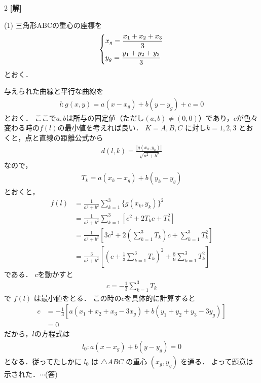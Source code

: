 \documentclass[../../../../main.tex]{subfiles}
\begin{document}
\setcounter{equation}{0}
\begin{oframed}
  
\end{oframed}
\setlength{\columnseprule}{0.4pt}
\begin{multicols}{2}
  {\bf[解]}

  (1)
  三角形ABCの重心の座標を
  \begin{align}
    \begin{dcases}
      x_g = \frac{x_1+x_2+x_3}{3} \\
      y_g = \frac{y_1+y_2+y_3}{3}
    \end{dcases}
  \end{align}
  とおく．

  与えられた曲線と平行な曲線を
  \begin{align*}
    l: g(x,y) = a(x-x_g) + b(y-y_g) + c = 0
  \end{align*}
  とおく．
  ここで$a,b$は所与の固定値（ただし$(a,b) \neq (0,0)$）であり，$c$が色々変わる時の$f(l)$の最小値を考えれば良い．
  $K=A,B,C$ に対し$k=1,2,3$ とおくと，点と直線の距離公式から
  \begin{align*}
    d(l,k) = \frac{|g(x_k, y_k)|}{\sqrt{a^2+b^2}}
  \end{align*}
  なので，
  \begin{align*}
    T_k = a(x_k-x_g) + b(y_k-y_g)
  \end{align*}
  とおくと，
  \begin{align*}
    f(l)
     & = \frac{1}{a^2+b^2} \sum_{k=1}^{3} \{g(x_k, y_k)\}^2                                                              \\
     & = \frac{1}{a^2+b^2} \sum_{k=1}^{3} [c^2 + 2T_kc + T_k^2]                                                          \\
     & = \frac{1}{a^2+b^2} \left[3c^2 + 2(\sum_{k=1}^{3} T_k)c + \sum_{k=1}^{3} T_k^2\right]                             \\
     & = \frac{3}{a^2+b^2} \left[\left(c+\frac{1}{3}\sum_{k=1}^{3} T_k\right)^2 + \frac{8}{9}\sum_{k=1}^{3} T_k^2\right]
  \end{align*}
  である．
  $c$を動かすと
  \begin{align*}
    c = -\frac{1}{3}\sum_{k=1}^{3}T_k
  \end{align*}
  で $f(l)$ は最小値をとる．
  この時の$c$を具体的に計算すると
  \begin{align*}
    c
     & = -\frac{1}{3} [a(x_1+x_2+x_3 - 3x_g) + b(y_1+y_2+y_3 - 3y_g)] \\
     & = 0
  \end{align*}
  だから，$l$の方程式は
  \begin{align*}
    l_0 : a(x-x_g) + b(y-y_g) = 0
  \end{align*}
  となる．従ってたしかに $l_0$ は $\triangle ABC$ の重心 $(x_g, y_g)$ を通る．
  よって題意は示された．$\cdots$(答)
  \vspace{10pt}


\end{multicols}
\end{document}
